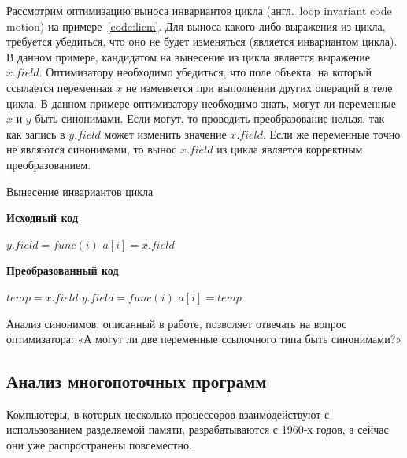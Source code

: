 \documentclass[14pt,titlepage]{extarticle}
\newcommand{\algorithmictitle}[1]{\hspace{8mm}\textbf{#1}}
\newcommand{\eng}[1]{{\English#1}}
\newcommand{\engdef}[1]{(англ.~\eng{#1})}
\begin{document}
      Рассмотрим оптимизацию выноса инвариантов цикла \engdef{loop invariant
      code motion} на примере~\ref{code:licm}.
      Для выноса какого-либо выражения из цикла, требуется убедиться, что оно
      не будет изменяться (является инвариантом цикла).
      В данном примере, кандидатом на вынесение из цикла является выражение
      $x.field$. Оптимизатору необходимо убедиться, что поле объекта, на
      который ссылается переменная $x$ не изменяется при выполнении других
      операций в теле цикла. В данном примере оптимизатору необходимо знать,
      могут ли переменные $x$ и $y$ быть синонимами. Если могут, то
      проводить преобразование нельзя, так как запись в $y.field$ может
      изменить значение $x.field$. Если же переменные точно не являются
      синонимами, то вынос $x.field$ из цикла является корректным
      преобразованием.

      \begin{algorithm}
        \caption{Вынесение инвариантов цикла}
        \label{code:licm}
        \begin{multicols*}{2}
          \algorithmictitle{Исходный код}
          \begin{algorithmic}[1]
            \STATE $y.field = func(i)$
            \STATE $a[i] = x.field$
            \ENDFOR
          \end{algorithmic}
          \columnbreak
          \algorithmictitle{Преобразованный код}
          \begin{algorithmic}[1]
            \STATE $temp = x.field$
            \STATE $y.field = func(i)$
            \STATE $a[i] = temp$
            \ENDFOR
          \end{algorithmic}
        \end{multicols*}
      \end{algorithm}

      Анализ синонимов, описанный в работе, позволяет отвечать на
      вопрос оптимизатора: «А могут ли две переменные ссылочного типа быть
      синонимами?»

    \subsection{Анализ многопоточных программ}
      \label{section:intro_to_multithreading}

      Компьютеры, в которых несколько процессоров взаимодействуют с
      использованием разделяемой памяти, разрабатываются с 1960-х годов, а
      сейчас они уже распространены повсеместно.
\end{document}
